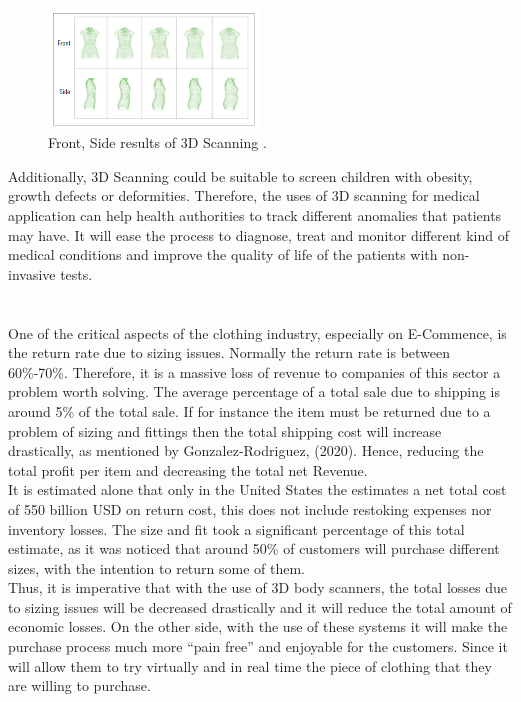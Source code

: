 \documentclass[a4paper]{article}
\begin{document}
\begin{figure}[h]
    \begin{center}
    \includegraphics[width=0.5\textwidth]{bodyMedicine.png}
    \caption{Front, Side results of 3D Scanning \cite[]{treleaven_wells_2007}.}
    \label{bodymed}
\end{center}
\end{figure}
Additionally, 3D Scanning could be suitable to screen children with obesity, growth defects or deformities.
Therefore, the uses of 3D scanning for medical application can help health authorities to track different anomalies that patients may have.
It will ease the process to diagnose, treat and monitor different kind of medical conditions and improve the quality of life of the patients with non-invasive tests. \\[12pt] 
\enlargethispage{\baselineskip}


\section*{}
One of the critical aspects of the clothing industry, especially on E-Commence, is the return rate due to sizing issues. Normally the return rate is between 60\%-70\%.
Therefore, it is a massive loss of revenue to companies of this sector a problem worth solving. 
The average percentage of a total sale due to shipping is around 5\% of the total sale. 
If for instance the item must be returned due to a problem of sizing and fittings then the total shipping cost will increase drastically, as mentioned by Gonzalez-Rodriguez, (2020). 
Hence, reducing the total profit per item and decreasing the total net Revenue.\\[10pt]
It is estimated alone that only in the United States the estimates a net total cost of 550 billion USD on return cost, this does not include restoking expenses nor inventory losses.
The size and fit took a significant percentage of this total estimate, as it was noticed that around 50\% of customers will purchase different sizes, with the intention to return some of them.\\[10pt]
Thus, it is imperative that with the use of 3D body scanners, the total losses due to sizing issues will be decreased drastically and it will reduce the total amount of economic losses.
On the other side, with the use of these systems it will make the purchase process much more “pain free” and enjoyable for the customers. Since it will allow them to try virtually and in real time the piece of clothing that they are willing to purchase.
\end{document}
